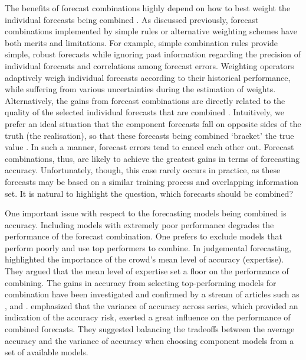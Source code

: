 \documentclass[11pt]{article}
\begin{document}
The benefits of forecast combinations highly depend on how to best weight the individual forecasts being combined \citep{Stock2004-rq,Timmermann2006-en}. As discussed previously, forecast combinations implemented by simple rules or alternative weighting schemes have both merits and limitations. For example, simple combination rules provide simple, robust forecasts while ignoring past information regarding the precision of individual forecasts and correlations among forecast errors. Weighting operators adaptively weigh individual forecasts according to their historical performance, while suffering from various uncertainties during the estimation of weights. Alternatively, the gains from forecast combinations are directly related to the quality of the selected individual forecasts that are combined \citep{Batchelor1995-ps,Geweke2011-xk}. Intuitively, we prefer an ideal situation that the component forecasts fall on opposite sides of the truth (the realisation), so that these forecasts being combined `bracket' the true value \citep{Bates1969-yj,Larrick2006-sr}. In such a manner, forecast errors tend to cancel each other out. Forecast combinations, thus, are likely to achieve the greatest gains in terms of forecasting accuracy. Unfortunately, though, this case rarely occurs in practice, as these forecasts may be based on a similar training process and overlapping information set. It is natural to highlight the question, which forecasts should be combined?

One important issue with respect to the forecasting models being combined is accuracy. Including models with extremely poor performance degrades the performance of the forecast combination. One prefers to exclude models that perform poorly and use top performers to combine. In judgemental forecasting, \cite{Mannes2014-dl} highlighted the importance of the crowd's mean level of accuracy (expertise). They argued that the mean level of expertise set a floor on the performance of combining. The gains in accuracy from selecting top-performing models for combination have been investigated and confirmed by a stream of articles such as \cite{Budescu2015-tu}, and \cite{Kourentzes2019-na}. \cite{Lichtendahl2020-ut} emphasized that the variance of accuracy across series, which provided an indication of the accuracy risk, exerted a great influence on the performance of combined forecasts. They suggested balancing the tradeoffs between the average accuracy and the variance of accuracy when choosing component models from a set of available models.
\end{document}
